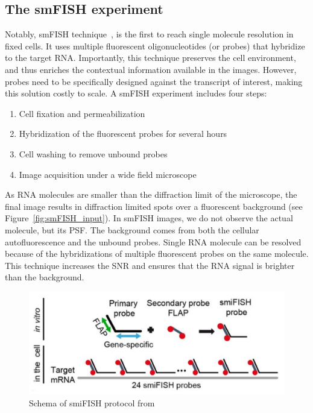 \subsection{The smFISH experiment}
\label{subsec:intro_smfish}

Notably, \ac{smFISH} technique~\cite{Femino_1998}, is the first to reach single molecule resolution in fixed cells.
It uses multiple fluorescent oligonucleotides (or probes) that hybridize to the target RNA.
Importantly, this technique preserves the cell environment, and thus enriches the contextual information available in the images.
However, probes need to be specifically designed against the transcript of interest, making this solution costly to scale.
A \ac{smFISH} experiment includes four steps:

\begin{enumerate}
	\setlength\itemsep{0.1em}
	\item Cell fixation and permeabilization
	\item Hybridization of the fluorescent probes for several hours
	\item Cell washing to remove unbound probes
	\item Image acquisition under a wide field microscope
\end{enumerate}

\noindent
As \ac{RNA} molecules are smaller than the diffraction limit of the microscope, the final image results in diffraction limited spots over a fluorescent background (see Figure~\ref{fig:smFISH_input}).
In \ac{smFISH} images, we do not observe the actual molecule, but its \ac{PSF}.
The background comes from both the cellular autofluorescence and the unbound probes.
Single \ac{RNA} molecule can be resolved because of the hybridizations of multiple fluorescent probes on the same molecule.
This technique increases the \ac{SNR} and ensures that the \ac{RNA} signal is brighter than the background.

\begin{figure}
	\begin{center}
	\includegraphics[width=\linewidth]{figures/introduction/smiFISH}
	\caption[Schema of smiFISH protocol]{Schema of smiFISH protocol from~\cite{tsanov_smifish_2016}}
	\label{fig:smiFISH}
	\end{center}
\end{figure}

